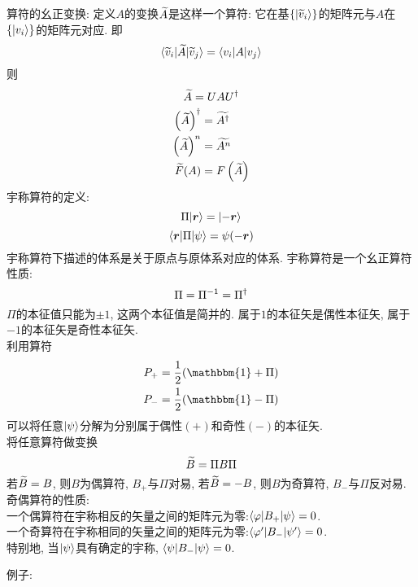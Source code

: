 \documentclass[UTF8]{ctexart}
\begin{document}
算符的幺正变换:
定义$A$的变换$\widetilde{A}$是这样一个算符: 它在基$\{| {\widetilde{v}_i} \rangle\}$的矩阵元与$A$在$\{| {v_i} \rangle\}$的矩阵元对应. 即
$$\langle {\widetilde{v}_i|\widetilde{A}|\widetilde{v}_j} \rangle = \langle {v_i|A|v_j} \rangle$$
则
$$\widetilde{A}=UAU^{\dagger}$$
$$\begin{aligned} 
    \left( \widetilde{A} \right)^{\dagger} &= \widetilde{A^{\dagger}}\\
    \left( \widetilde{A} \right)^n &= \widetilde{A^n}\\
    \widetilde{F}(A) &= F\left( \widetilde{A} \right)
 \end{aligned}$$
宇称算符的定义:
$$\Pi| {\bm{r}} \rangle=| {-\bm{r}} \rangle$$
$$\langle {\bm{r}|\Pi|\psi} \rangle=\psi(-\bm{r})$$
宇称算符下描述的体系是关于原点与原体系对应的体系. 宇称算符是一个幺正算符\\
性质:\\
$$\Pi=\Pi^{-1}=\Pi^{\dagger}$$
$\Pi$的本征值只能为$\pm1$, 这两个本征值是简并的. 属于$1$的本征矢是偶性本征矢, 属于$-1$的本征矢是奇性本征矢.\\
利用算符
$$\ar{
    P_+=\ff{2}(\mathbbm{1}+\Pi)\\
    P_-=\ff{2}(\mathbbm{1}-\Pi)
}$$
可以将任意$| {\psi} \rangle$分解为分别属于偶性$(+)$和奇性$(-)$的本征矢. \\
将任意算符做变换
$$\widetilde{B}=\Pi B \Pi$$
若$\widetilde{B}=B$, 则$B$为偶算符, $B_+$与$\Pi$对易, 若$\widetilde{B}=-B$, 则$B$为奇算符, $B_-$与$\Pi$反对易.\\
奇偶算符的性质:\\
一个偶算符在宇称相反的矢量之间的矩阵元为零:$\langle {\varphi|B_+|\psi} \rangle=0$. \\
一个奇算符在宇称相同的矢量之间的矩阵元为零:$\langle {\varphi'|B_-|\psi'} \rangle=0$. \\
特别地, 当$| {\psi} \rangle$具有确定的宇称, $\langle {\psi|B_-|\psi} \rangle=0$.

例子:
\end{document}
